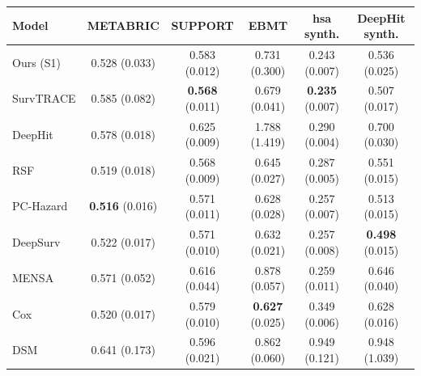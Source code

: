 \begin{tabular}{lccccc}
\toprule
Model & METABRIC & SUPPORT & EBMT & hsa synth. & DeepHit synth. \\
\midrule
Ours (S1) & 0.528 (0.033) & 0.583 (0.012) & 0.731 (0.300) & 0.243 (0.007) & 0.536 (0.025) \\
SurvTRACE & 0.585 (0.082) & \textbf{0.568} (0.011) & 0.679 (0.041) & \textbf{0.235} (0.007) & 0.507 (0.017) \\
DeepHit & 0.578 (0.018) & 0.625 (0.009) & 1.788 (1.419) & 0.290 (0.004) & 0.700 (0.030) \\
RSF & 0.519 (0.018) & 0.568 (0.009) & 0.645 (0.027) & 0.287 (0.005) & 0.551 (0.015) \\
PC-Hazard & \textbf{0.516} (0.016) & 0.571 (0.011) & 0.628 (0.028) & 0.257 (0.007) & 0.513 (0.015) \\
DeepSurv & 0.522 (0.017) & 0.571 (0.010) & 0.632 (0.021) & 0.257 (0.008) & \textbf{0.498} (0.015) \\
MENSA & 0.571 (0.052) & 0.616 (0.044) & 0.878 (0.057) & 0.259 (0.011) & 0.646 (0.040) \\
Cox & 0.520 (0.017) & 0.579 (0.010) & \textbf{0.627} (0.025) & 0.349 (0.006) & 0.628 (0.016) \\
DSM & 0.641 (0.173) & 0.596 (0.021) & 0.862 (0.060) & 0.949 (0.121) & 0.948 (1.039) \\
\bottomrule
\end{tabular}
